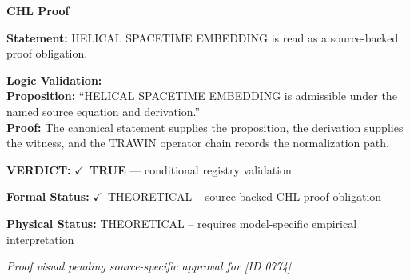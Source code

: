 \vspace{0.45em}
\noindent\textbf{CHL Proof}\par
\textbf{Statement:} HELICAL SPACETIME EMBEDDING is read as a source-backed proof obligation.

\textbf{Logic Validation:}\\
\textbf{Proposition:} ``HELICAL SPACETIME EMBEDDING is admissible under the named source equation and derivation.''\\
\textbf{Proof:} The canonical statement supplies the proposition, the derivation supplies the witness, and the TRAWIN operator chain records the normalization path.

\textbf{VERDICT:} \ensuremath{\checkmark}\ \textbf{TRUE} --- conditional registry validation

\textbf{Formal Status:} \ensuremath{\checkmark}\ THEORETICAL -- source-backed CHL proof obligation

\textbf{Physical Status:} THEORETICAL -- requires model-specific empirical interpretation
\par\vspace{0.45em}
\par
\vfill
\begingroup\footnotesize\itshape
Proof visual pending source-specific approval for [ID 0774].
\par\endgroup
\vfill
\endgroup
\endgroup
